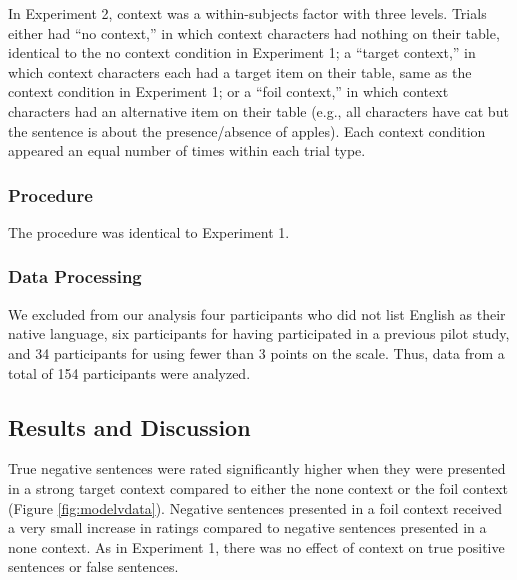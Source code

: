 \documentclass[10pt,letterpaper]{article}
\begin{document}
In Experiment 2, context was a within-subjects factor with three levels. Trials either had ``no context,'' in which context characters had nothing on their table, identical to the no context condition in Experiment 1; a ``target context,'' in which context characters each had a target item on their table, same as the context condition in Experiment 1; or a ``foil context,'' in which context characters had an alternative item on their table (e.g., all characters have cat but the sentence is about the presence/absence of apples).  Each context condition appeared an equal number of times within each trial type.  


\subsubsection{Procedure}

The procedure was identical to Experiment 1.

\subsubsection{Data Processing}

We excluded from our analysis four participants who did not list English as their native language, six participants for having participated in a previous pilot study, and 34 participants for using fewer than 3 points on the scale.  Thus, data from a total of 154 participants were analyzed.  

\subsection{Results and Discussion}

True negative sentences were rated significantly higher when they were presented in a strong target context compared to either the none context or the foil context (Figure \ref{fig:modelvdata}).  Negative sentences presented in a foil context received a very small increase in ratings compared to negative sentences presented in a none context. As in Experiment 1, there was no effect of context on true positive sentences or false sentences.  


\end{document}
